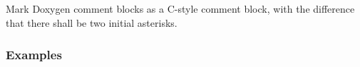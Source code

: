 \subsection*{\doxygenRule{}}

Mark Doxygen comment blocks as a C-style comment block, with the difference that there shall be two initial asterisks.

\subsubsection*{Examples}

\noindent
\begin{minipage}[t]{0.47\textwidth}
    
\end{minipage}\hfill
\begin{minipage}[t]{0.47\textwidth}
    
\end{minipage}

\noindent
\begin{minipage}[t]{0.47\textwidth}
    
\end{minipage}\hfill

\noindent
\begin{minipage}[t]{0.47\textwidth}
    
\end{minipage}\hfill
